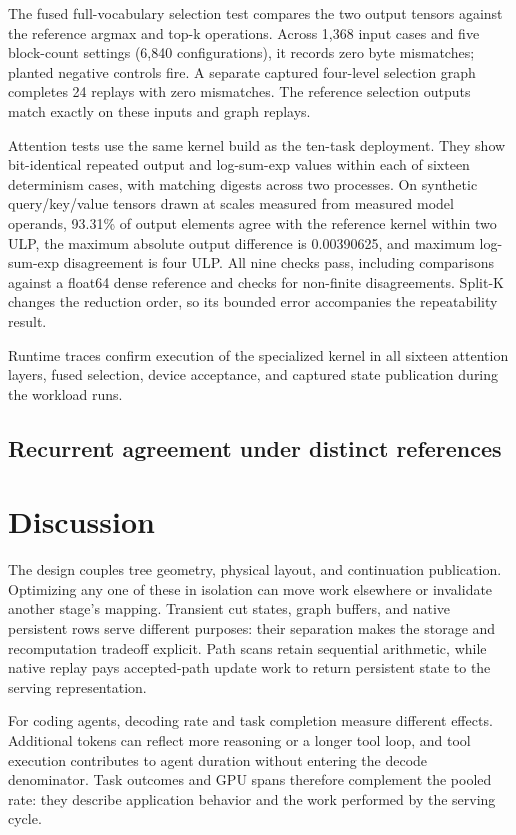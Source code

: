 \documentclass[conference]{IEEEtran}
\begin{document}
The fused full-vocabulary selection test compares the two output tensors against the reference argmax and top-k operations. Across 1,368 input cases and five block-count settings (6,840 configurations), it records zero byte mismatches; planted negative controls fire. A separate captured four-level selection graph completes 24 replays with zero mismatches. The reference selection outputs match exactly on these inputs and graph replays.

Attention tests use the same kernel build as the ten-task deployment. They show bit-identical repeated output and log-sum-exp values within each of sixteen determinism cases, with matching digests across two processes. On synthetic query/key/value tensors drawn at scales measured from measured model operands, 93.31\% of output elements agree with the reference kernel within two ULP, the maximum absolute output difference is 0.00390625, and maximum log-sum-exp disagreement is four ULP. All nine checks pass, including comparisons against a float64 dense reference and checks for non-finite disagreements. Split-K changes the reduction order, so its bounded error accompanies the repeatability result.

Runtime traces confirm execution of the specialized kernel in all sixteen attention layers, fused selection, device acceptance, and captured state publication during the workload runs.

\subsection{Recurrent agreement under distinct references}
\label{sec:m1-qualification}


\section{Discussion}
\label{sec:discussion}
The design couples tree geometry, physical layout, and continuation publication. Optimizing any one of these in isolation can move work elsewhere or invalidate another stage's mapping. Transient cut states, graph buffers, and native persistent rows serve different purposes: their separation makes the storage and recomputation tradeoff explicit. Path scans retain sequential arithmetic, while native replay pays accepted-path update work to return persistent state to the serving representation.

For coding agents, decoding rate and task completion measure different effects. Additional tokens can reflect more reasoning or a longer tool loop, and tool execution contributes to agent duration without entering the decode denominator. Task outcomes and GPU spans therefore complement the pooled rate: they describe application behavior and the work performed by the serving cycle.
\end{document}
